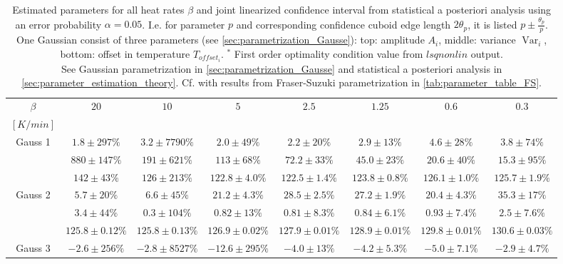 \documentclass{scrartcl}[12pt, halfparskip]
\numberwithin{equation}{section}
\numberwithin{figure}{section}
\numberwithin{table}{section}
\newcommand{\var}{\operatorname{Var}}
\begin{document}
\newpage
\begin{landscape}
	


\begin{table}[H]
	\centering
	\caption{Estimated parameters for all heat rates $\beta$ and joint linearized confidence interval from statistical a posteriori analysis using an error probability $\alpha=0.05$. I.e. for parameter $p$ and corresponding confidence cuboid edge length $2\theta_p$, it is listed $p \pm \frac{\theta_p}{p}$.
	One Gaussian consist of three parameters (see \cref{sec:parametrization_Gausse}): top: amplitude $A_i$, middle: variance $\var_i$, bottom: offset in temperature $T_{offset_i}$. $^*$ First order optimality condition value from $lsqnonlin$ output. \\
	See Gaussian parametrization in \cref{sec:parametrization_Gausse} and statistical a posteriori analysis in \cref{sec:parameter_estimation_theory}. Cf. with results from Fraser-Suzuki parametrization in \cref{tab:parameter_table_FS}.}
	\begin{tabular}{| c | c | c | c | c | c | c | c |} \hline
		$\beta$ & $20$ & $10$ & $5$ & $2.5$ & $1.25$ & $0.6$ & $0.3$ \\ 
		$[K/min]$ & & & & & & & \\ \hline
		Gauss 1 & $1.8 \pm 297\%$ & $3.2 \pm 7790\%$ & $2.0 \pm 49\%$ & $2.2 \pm 20\%$ & $2.9 \pm 13\%$ & $4.6 \pm 28\%$ & $3.8 \pm 74\%$ \\
		& $880 \pm 147\%$ & $191 \pm 621\%$ & $113 \pm 68\%$ & $72.2 \pm 33\%$ & $45.0 \pm 23\%$ & $20.6 \pm 40\%$ & $15.3 \pm 95\%$ \\
		& $142 \pm 43\%$ & $126 \pm 213\%$ & $122.8 \pm 4.0\%$ & $122.5 \pm 1.4\%$ & $123.8 \pm 0.8\%$ & $126.1 \pm 1.0\%$ & $125.7 \pm 1.9\%$ \\ \hline
		Gauss 2 & $5.7 \pm 20\%$ & $6.6 \pm 45\%$ & $21.2 \pm 4.3\%$ & $28.5 \pm 2.5\%$ & $27.2 \pm 1.9\%$ & $20.4 \pm 4.3\%$ & $35.3 \pm 17\%$ \\
		& $3.4 \pm 44\%$ & $0.3 \pm 104\%$ & $0.82 \pm 13\%$ & $0.81 \pm 8.3\%$ & $0.84 \pm 6.1\%$ & $0.93 \pm 7.4\%$ & $2.5 \pm 7.6\%$ \\
		& $125.8 \pm 0.12\%$ & $125.8 \pm 0.13\%$ & $126.9 \pm 0.02\%$ & $127.9 \pm 0.01\%$ & $128.9 \pm 0.01\%$ & $129.8 \pm 0.01\%$ & $130.6 \pm 0.03\%$ \\ \hline
		Gauss 3 & $-2.6 \pm 256\%$ & $-2.8 \pm 8527\%$ & $-12.6 \pm 295\%$ & $-4.0 \pm 13\%$ & $-4.2 \pm 5.3\%$ & $-5.0 \pm 7.1\%$ & $-2.9 \pm 4.7\%$ \\

\end{tabular}
\end{table}
\end{landscape}
\end{document}
